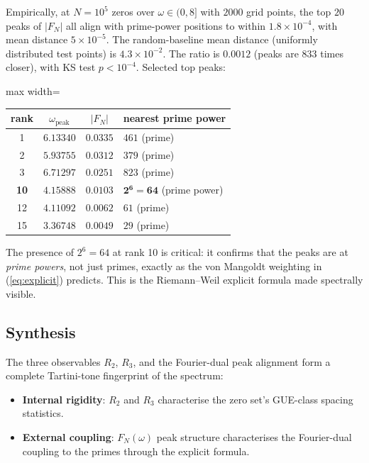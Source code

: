 \documentclass[11pt,a4paper]{article}
\theoremstyle{plain}
\theoremstyle{definition}
\theoremstyle{remark}
\begin{document}
Empirically, at $N = 10^5$ zeros over $\omega \in (0, 8]$ with
$2000$ grid points, the top $20$ peaks of $|F_N|$ all align with
prime-power positions to within $1.8 \times 10^{-4}$, with mean
distance $5 \times 10^{-5}$. The random-baseline mean distance
(uniformly distributed test points) is $4.3 \times 10^{-2}$.
The ratio is $0.0012$ (peaks are 833 times closer), with KS test
$p < 10^{-4}$. Selected top peaks:

\begin{center}
\begin{adjustbox}{max width=\linewidth}\begin{tabular}{cccl}
\toprule
rank & $\omega_{\text{peak}}$ & $|F_N|$ & nearest prime power \\
\midrule
1 & $6.13340$ & $0.0335$ & $461$ (prime) \\
2 & $5.93755$ & $0.0312$ & $379$ (prime) \\
3 & $6.71297$ & $0.0251$ & $823$ (prime) \\
\textbf{10} & $\mathbf{4.15888}$ & $\mathbf{0.0103}$ & $\mathbf{2^6 = 64}$ (prime power) \\
12 & $4.11092$ & $0.0062$ & $61$ (prime) \\
15 & $3.36748$ & $0.0049$ & $29$ (prime) \\
\bottomrule
\end{tabular}\end{adjustbox}
\end{center}

The presence of $2^6 = 64$ at rank 10 is critical: it confirms that
the peaks are at \emph{prime powers}, not just primes, exactly as the
von Mangoldt weighting in (\ref{eq:explicit}) predicts. This is the
Riemann--Weil explicit formula made spectrally visible.

\subsection{Synthesis}
\label{sec:tartini-synthesis}

The three observables $R_2$, $R_3$, and the Fourier-dual peak alignment
form a complete Tartini-tone fingerprint of the spectrum:

\begin{itemize}
\item \textbf{Internal rigidity}: $R_2$ and $R_3$ characterise the
zero set's GUE-class spacing statistics.
\item \textbf{External coupling}: $F_N(\omega)$ peak structure
characterises the Fourier-dual coupling to the primes through the
explicit formula.
\end{itemize}
\end{document}
